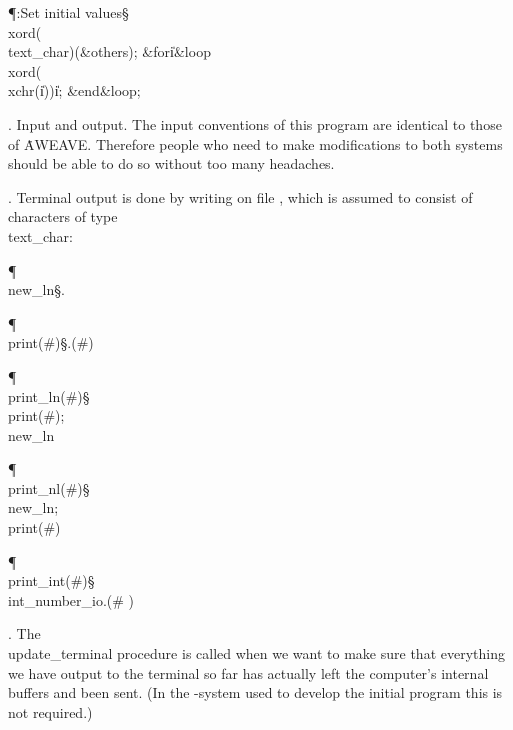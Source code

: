 \Y\P\?\4:Set initial values\X\mathrel{+}\S\?\6
\\{xord}\?\1(\?\\{text\_char}\?\2)\K\1(\?\&{others}\?\8\KR{}\2)\?;\6
\1\&{for}\8\|i\?\in{}\?\to{}\?\8\&{loop}\6
\\{xord}\?\1(\?\\{xchr}\?\1(\?\|i\?\2)\2)\K\?\|i;\2\6
\&{end}\8\&{loop};\par
\fi

.  Input and output.
The input conventions of this program are identical to those of \.{AWEAVE}.
Therefore people who need to make modifications to both systems
should be able to do so without too many headaches.

\fi

. Terminal output is done by writing on file , which is
assumed to consist of characters of type \\{text\_char}:

\Y\P\4\D\\{new\_ln}\?\S\?\?.\?\?\6
\?\par
\P\4\D\\{print}\?\1(\?\#\?\2)\S\?\?.\?\?\1(\?\#\?\2)\6
\?\par
\P\4\D\\{print\_ln}\?\1(\?\#\?\2)\S\?\\{print}\?\1(\?\#\?\2)\?; \\{new\_ln}\?%
\6
\?\par
\P\4\D\\{print\_nl}\?\1(\?\#\?\2)\S\?\\{new\_ln}; \\{print}\?\1(\?\#\?\2)%
\6
\?\par
\P\4\D\\{print\_int}\?\1(\?\#\?\2)\S\?\\{int\_number\_io}\?.\?\?\1(\?\#%
\?\2)\6
\?\par
\fi

. The \\{update\_terminal} procedure is called when we want
to make sure that everything we have output to the terminal so far has
actually left the computer's internal buffers and been sent.
(In the \ADA-system used to develop the initial program this is not
required.)

